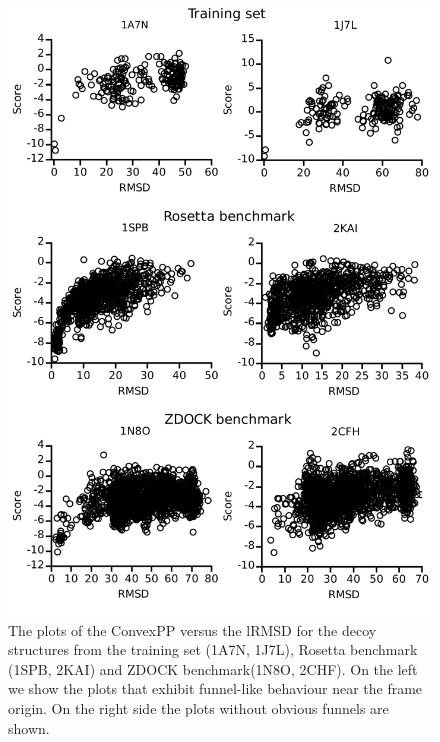 \begin{figure}[H]
\begin{center}
\includegraphics[scale=0.3]{Scoring/Fig/AllFunnels}
\caption[The plots of the ConvexPP versus the lRMSD for the decoy structures]{The plots of the ConvexPP versus the lRMSD for the decoy structures
from the training set (1A7N, 1J7L), Rosetta benchmark (1SPB, 2KAI) and ZDOCK benchmark(1N8O, 2CHF). 
On the left we show the plots that exhibit funnel-like behaviour near the frame origin. On the right side the plots
without obvious funnels are shown.
}
\label{fig:funnels} 
\end{center}
\end{figure}

